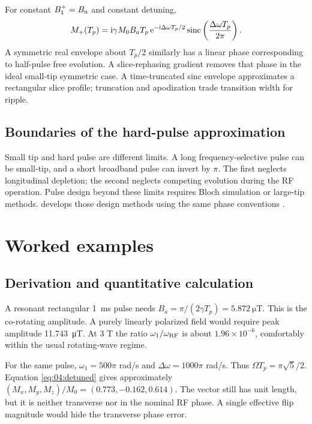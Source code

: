 For constant $B_{1}^{+}=B_a$ and constant detuning,
\[
 M_+(T_p)=\mathrm{i}\gamma M_0B_aT_p\,
       \mathrm{e}^{-\mathrm{i}\Delta\omega T_p/2}
       \operatorname{sinc}\left(\frac{\Delta\omega T_p}{2\pi}\right).
\]
A symmetric real envelope about $T_p/2$ similarly has a linear phase
corresponding to half-pulse free evolution. A slice-rephasing gradient
removes that phase in the ideal small-tip symmetric case.
A time-truncated sinc envelope approximates a rectangular slice profile;
truncation and apodization trade transition width for ripple.

\subsection{Boundaries of the hard-pulse approximation}
Small tip and hard pulse are different limits. A long frequency-selective
pulse can be small-tip, and a short broadband pulse can invert by $\pi$.
The first neglects longitudinal depletion; the second neglects competing
evolution during the RF operation.
Pulse design beyond these limits requires Bloch simulation or
large-tip methods.  develops those design methods using the
same phase conventions \cite{bernstein2004}.

\section{Worked examples}
\label{sec:04:worked-examples}
\subsection{Derivation and quantitative calculation}
\begin{workedexample}
A resonant rectangular \SI{1}{\milli\second} pulse needs
$B_a=\pi/(2\gamma T_p)=\SI{5.872}{\micro\tesla}$.
This is the co-rotating amplitude. A purely linearly polarized field
would require peak amplitude \SI{11.743}{\micro\tesla}.
At 3 T the ratio $\omega_1/\omega_{\rm RF}$ is about
$1.96\times10^{-6}$, comfortably within the usual rotating-wave regime.
\end{workedexample}
\begin{workedexample}
For the same pulse, $\omega_1=500\pi$ rad/s and
$\Delta\omega=1000\pi$ rad/s. Thus $\Omega T_p=\pi\sqrt5/2$.
Equation \eqref{eq:04:detuned} gives approximately
$(M_x,M_y,M_z)/M_0=(0.773,-0.162,0.614)$.
The vector still has unit length, but it is neither transverse nor in
the nominal RF phase. A single effective flip magnitude would hide
the transverse phase error.
\end{workedexample}
